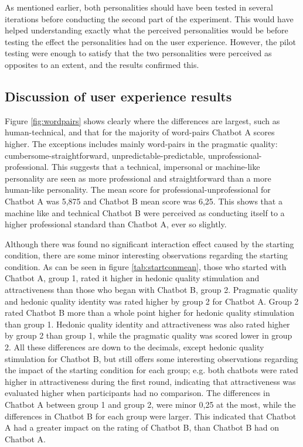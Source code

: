 As mentioned earlier, both personalities should have been tested in several iterations before conducting the second part of the experiment. This would have helped understanding exactly what the perceived personalities would be before testing the effect the personalities had on the user experience. However, the pilot testing were enough to satisfy that the two personalities were perceived as opposites to an extent, and the results confirmed this.


\subsection{Discussion of user experience results}

Figure \ref{fig:wordpairs} shows clearly where the differences are largest, such as human-technical, and that for the majority of word-pairs Chatbot A scores higher. The exceptions includes mainly word-pairs in the pragmatic quality: cumbersome-straightforward, unpredictable-predictable, unprofessional-professional. This suggests that a technical, impersonal or machine-like personality are seen as more professional and straightforward than a more human-like personality. The mean score for professional-unprofessional for Chatbot A was 5,875 and Chatbot B mean score was 6,25. This shows that a machine like and technical Chatbot B were perceived as conducting itself to a higher professional standard than Chatbot A, ever so slightly.

Although there was found no significant interaction effect caused by the starting condition, there are some minor interesting observations regarding the starting condition. As can be seen in figure \ref{tab:startconmean}, those who started with Chatbot A, group 1, rated it higher in hedonic quality stimulation and attractiveness than those who began with Chatbot B, group 2. Pragmatic quality and hedonic quality identity was rated higher by group 2 for Chatbot A. Group 2 rated Chatbot B more than a whole point higher for hedonic quality stimulation than group 1. Hedonic quality identity and attractiveness was also rated higher by group 2 than group 1, while the pragmatic quality was scored lower in group 2. All these differences are down to the decimals, except hedonic  quality stimulation for Chatbot B, but still offers some interesting observations regarding the impact of the starting condition for each group; e.g. both chatbots were rated higher in attractiveness during the first round, indicating that attractiveness was evaluated higher when participants had no comparison. The differences in Chatbot A between group 1 and group 2, were minor 0,25 at the most, while the differences in Chatbot B for each group were larger. This indicated that Chatbot A had a greater impact on the rating of Chatbot B, than Chatbot B had on Chatbot A.

